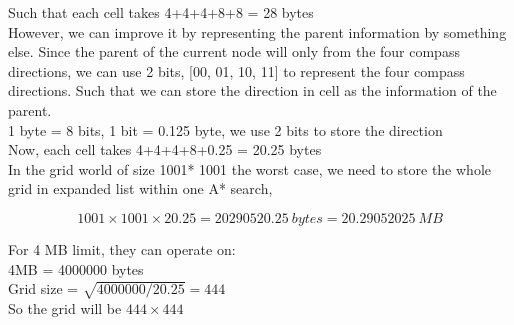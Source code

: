 \documentclass[11pt]{report}
\begin{document}
Such that each cell takes 4+4+4+8+8 = 28 bytes\\

However, we can improve it by representing the parent information by something else. Since the parent of the current node will only from the four compass directions, we can use 2 bits, [00, 01, 10, 11] to represent the four compass directions. Such that we can store the direction in cell as the information of the parent. \\

1 byte = 8 bits, 1 bit = 0.125 byte, we use 2 bits to store the direction\\

Now, each cell takes 4+4+4+8+0.25 = 20.25 bytes\\

In the grid world of size 1001* 1001 the worst case, we need to store the whole grid in expanded list within one A* search,

$$1001 \times 1001 \times 20.25 = 20290520.25 \ bytes = 20.29052025 \ MB$$

For 4 MB limit, they can operate on:\\

4MB = 4000000 bytes\\

Grid size = $\sqrt{4000000/20.25} = 444$\\

So the grid will be $444 \times 444$
\end{document}
